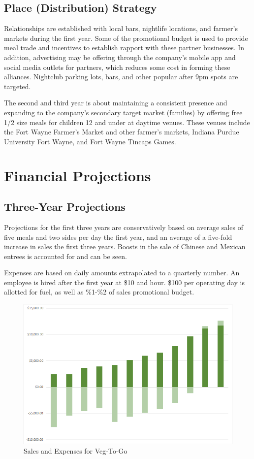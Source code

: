 \documentclass[12pt, letterpaper]{article}
\newcommand{\companyname}{Veg-To-Go}
\begin{document}
\subsection{Place (Distribution) Strategy}
Relationships are established with local bars, nightlife locations, and farmer's markets during the first year.  Some of the promotional budget is used to provide meal trade and incentives to establish rapport with these partner businesses.  In addition, advertising may be offering through the company's mobile app and social media outlets for partners, which reduces some cost in forming these alliances.  Nightclub parking lots, bars, and other popular after 9pm spots are targeted.

The second and third year is about maintaining a consistent presence and expanding to the company's secondary target market (families) by offering free 1/2 size meals for children 12 and under at daytime venues.  These venues include the Fort Wayne Farmer's Market and other farmer's markets, Indiana Purdue University Fort Wayne, and Fort Wayne Tincaps Games.

\newpage

\section{Financial Projections}
\subsection{Three-Year Projections}

Projections for the first three years are conservatively based on average sales of five meals and two sides per day the first year, and an average of a five-fold increase in sales the first three years.  Boosts in the sale of Chinese and Mexican entrees is accounted for and can be seen.

Expenses are based on daily amounts extrapolated to a quarterly number. An employee is hired after the first year at \$10 and hour.  \$100 per operating day is allotted for fuel, as well as \%1-\%2 of sales promotional budget.

\begin{figure}[H]
	\caption{Sales and Expenses for \companyname{}}
	\includegraphics[width=\textwidth]{SalesAndExpenses}
\end{figure}
\end{document}

